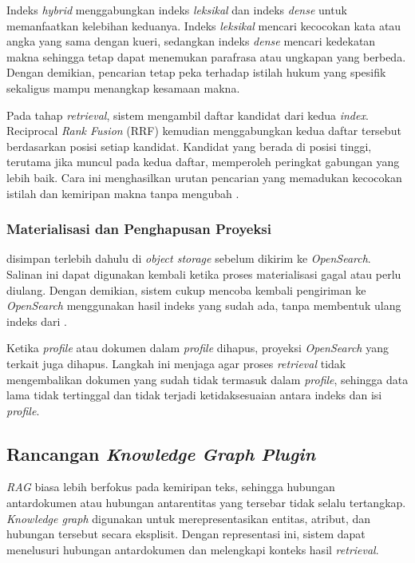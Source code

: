 Indeks \emph{hybrid} menggabungkan indeks \emph{leksikal} dan indeks \emph{dense} untuk memanfaatkan kelebihan keduanya. Indeks \emph{leksikal} mencari kecocokan kata atau angka yang sama dengan kueri, sedangkan indeks \emph{dense} mencari kedekatan makna sehingga tetap dapat menemukan parafrasa atau ungkapan yang berbeda. Dengan demikian, pencarian tetap peka terhadap istilah hukum yang spesifik sekaligus mampu menangkap kesamaan makna.

Pada tahap \emph{retrieval}, sistem mengambil daftar kandidat dari kedua \emph{index}. Reciprocal \emph{Rank Fusion} (RRF) kemudian menggabungkan kedua daftar tersebut berdasarkan posisi setiap kandidat. Kandidat yang berada di posisi tinggi, terutama jika muncul pada kedua daftar, memperoleh peringkat gabungan yang lebih baik. Cara ini menghasilkan urutan pencarian yang memadukan kecocokan istilah dan kemiripan makna tanpa mengubah .

\subsubsection{Materialisasi dan Penghapusan Proyeksi}
\label{subsubsec:materialisasi-index}

\mbox{} disimpan terlebih dahulu di \emph{object storage} sebelum dikirim ke \emph{OpenSearch}. Salinan ini dapat digunakan kembali ketika proses materialisasi gagal atau perlu diulang. Dengan demikian, sistem cukup mencoba kembali pengiriman ke \emph{OpenSearch} menggunakan hasil indeks yang sudah ada, tanpa membentuk ulang indeks dari \mbox{}.

Ketika \emph{profile} atau dokumen dalam \emph{profile} dihapus, proyeksi \emph{OpenSearch} yang terkait juga dihapus. Langkah ini menjaga agar proses \emph{retrieval} tidak mengembalikan dokumen yang sudah tidak termasuk dalam \emph{profile}, sehingga data lama tidak tertinggal dan tidak terjadi ketidaksesuaian antara indeks dan isi \emph{profile}.

\subsection{Rancangan \emph{Knowledge Graph Plugin}}
\label{subsec:solusi-knowledge-graph}

\emph{RAG} biasa lebih berfokus pada kemiripan teks, sehingga hubungan antardokumen atau hubungan antarentitas yang tersebar tidak selalu tertangkap. \emph{Knowledge graph} digunakan untuk merepresentasikan entitas, atribut, dan hubungan tersebut secara eksplisit. Dengan representasi ini, sistem dapat menelusuri hubungan antardokumen dan melengkapi konteks hasil \emph{retrieval}.

